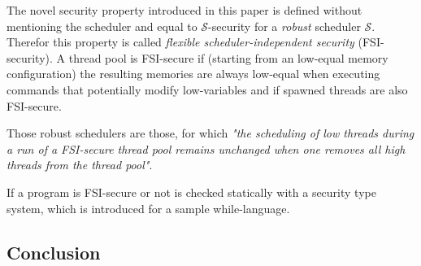 \documentclass[a4paper,10pt]{llncs}
\begin{document}
The novel security property introduced in this paper is defined without mentioning the
scheduler and equal to $\mathcal{S}$-security for a \textit{robust} scheduler $\mathcal{S}$.
Therefor this property is called \textit{flexible scheduler-independent security} (FSI-security).
A thread pool is FSI-secure if (starting from an low-equal memory configuration) the resulting
memories are always low-equal when executing commands that potentially modify low-variables and if
spawned threads are also FSI-secure.

Those robust schedulers are those, for which \textit{"the scheduling of low threads during a run of a FSI-secure
thread pool remains unchanged when one removes all high threads from the thread pool"}\cite{Mantel10}.

If a program is FSI-secure or not is checked statically with a security type system, which is introduced
for a sample while-language.

\subsection{Conclusion}


\end{document}
